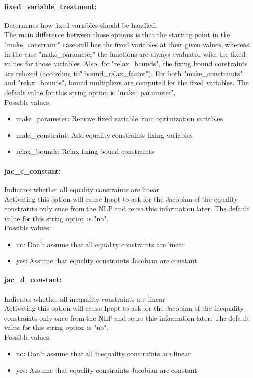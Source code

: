 \paragraph{fixed\_variable\_treatment:}\label{sec:fixed_variable_treatment} Determines how fixed variables should be handled. $\;$ \\
 The main difference between those options is that
the starting point in the "make\_constraint" case
still has the fixed variables at their given
values, whereas in the case "make\_parameter" the
functions are always evaluated with the fixed
values for those variables.  Also, for
"relax\_bounds", the fixing bound constraints are
relaxed (according to" bound\_relax\_factor").
For both "make\_constraints" and "relax\_bounds",
bound multipliers are computed for the fixed
variables.
The default value for this string option is "make\_parameter".
\\ 
Possible values:
\begin{itemize}
   \item make\_parameter: Remove fixed variable from optimization
variables
   \item make\_constraint: Add equality constraints fixing variables
   \item relax\_bounds: Relax fixing bound constraints
\end{itemize}

\paragraph{jac\_c\_constant:}\label{sec:jac_c_constant} Indicates whether all equality constraints are linear $\;$ \\
 Activating this option will cause Ipopt to ask
for the Jacobian of the equality constraints only
once from the NLP and reuse this information
later.
The default value for this string option is "no".
\\ 
Possible values:
\begin{itemize}
   \item no: Don't assume that all equality constraints are
linear
   \item yes: Assume that equality constraints Jacobian are
constant
\end{itemize}

\paragraph{jac\_d\_constant:}\label{sec:jac_d_constant} Indicates whether all inequality constraints are linear $\;$ \\
 Activating this option will cause Ipopt to ask
for the Jacobian of the inequality constraints
only once from the NLP and reuse this information
later.
The default value for this string option is "no".
\\ 
Possible values:
\begin{itemize}
   \item no: Don't assume that all inequality constraints
are linear
   \item yes: Assume that equality constraints Jacobian are
constant
\end{itemize}

